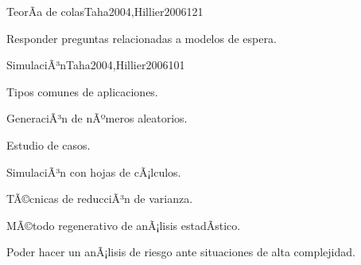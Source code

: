 \begin{syllabus}
\begin{unit}{TeorÃ­a de colas}{Taha2004,Hillier2006}{12}{1}
   \begin{unitgoals}
      \item Responder preguntas relacionadas a modelos de espera.
   \end{unitgoals}
\end{unit}

\begin{unit}{SimulaciÃ³n}{Taha2004,Hillier2006}{10}{1}
   \begin{topics}
      \item Tipos comunes de aplicaciones.
      \item GeneraciÃ³n de nÃºmeros aleatorios.
      \item Estudio de casos.
      \item SimulaciÃ³n con hojas de cÃ¡lculos.
      \item TÃ©cnicas de reducciÃ³n de varianza.
      \item MÃ©todo regenerativo de anÃ¡lisis estadÃ­stico.
   \end{topics}

   \begin{unitgoals}
      \item Poder hacer un anÃ¡lisis de riesgo ante situaciones de alta complejidad.
   \end{unitgoals}
\end{unit}



\begin{coursebibliography}
\end{coursebibliography}

\end{syllabus}
